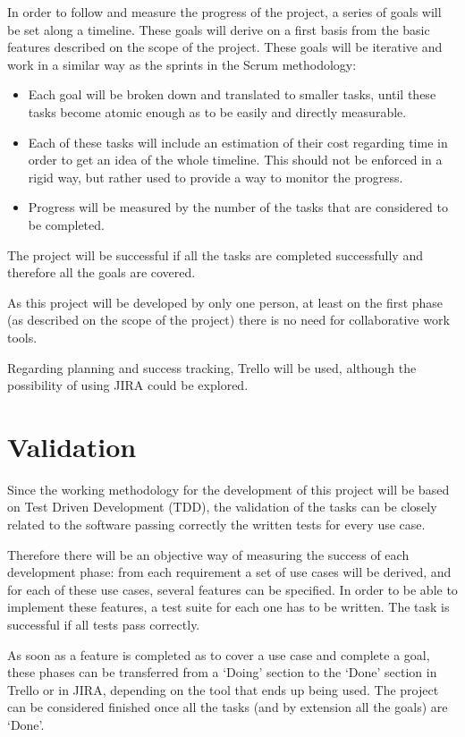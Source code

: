 In order to follow and measure the progress of the project, a series of goals will be set along a timeline. These goals will derive on a first basis from the basic features described on the scope of the project. These goals will be iterative and work in a similar way as the sprints in the Scrum methodology:

\begin{itemize}
\item Each goal will be broken down and translated to smaller tasks, until these tasks become atomic enough as to be easily and directly measurable.

\item Each of these tasks will include an estimation of their cost regarding time in order to get an idea of the whole timeline. This should not be enforced in a rigid way, but rather used to provide a way to monitor the progress. 

\item Progress will be measured by the number of the tasks that are considered to be completed. 
\end{itemize}

The project will be successful if all the tasks are completed successfully and therefore all the goals are covered.

As this project will be developed by only one person, at least on the first phase (as described on the scope of the project) there is no need for collaborative work tools.

Regarding planning and success tracking, Trello will be used, although the possibility of using JIRA could be explored.

\section{Validation}
Since the working methodology for the development of this project will be based on Test Driven Development (TDD), the validation of the tasks can be closely related to the software passing correctly the written tests for every use case. 

Therefore there will be an objective way of measuring the success of each development phase: from each requirement a set of use cases will be derived, and for each of these use cases, several features can be specified. In order to be able to implement these features, a test suite for each one has to be written. The task is successful if all tests pass correctly.

As soon as a feature is completed as to cover a use case and complete a goal, these phases can be transferred from a ‘Doing’ section to the ‘Done’ section in Trello or in JIRA, depending on the tool that ends up being used. The project can be considered finished once all the tasks (and by extension all the goals) are ‘Done’.